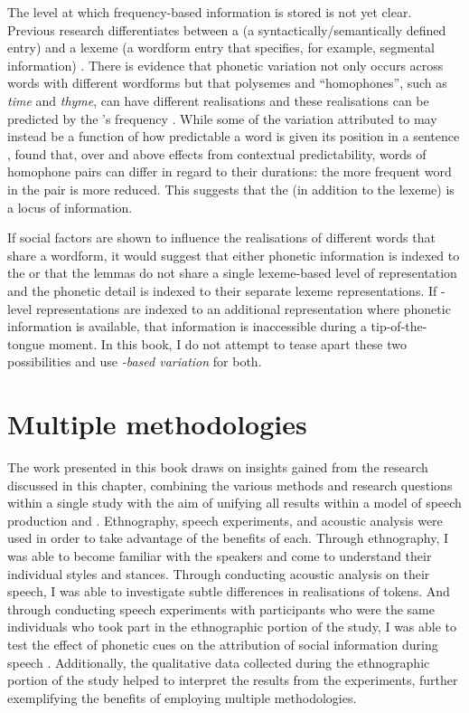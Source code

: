 The level at which frequency-based information is stored is not yet clear. Previous research differentiates between a  (a syntactically/semantically defined entry) and a lexeme (a wordform entry that specifies, for example, segmental information) \citep{bock1995}. There is evidence that phonetic variation not only occurs across words with different wordforms but that polysemes and ``homophones'', such as \textit{time} and \textit{thyme}, can have different realisations and these realisations can be predicted by the 's frequency \citep{gahl-thyme,jurafskyetal2002}. While some of the variation attributed to  may instead be a function of how predictable a word is given its position in a sentence \citep{jurafskyetal2002}, \citet{gahl-thyme} found that, over and above effects from contextual predictability, words of homophone pairs can differ in regard to their durations: the more frequent word in the pair is more reduced. This suggests that the  (in addition to the lexeme) is a locus of  information. 

If social factors are shown to influence the realisations of different words that share a wordform, it would suggest that either phonetic information is indexed to the  or that the lemmas do not share a single lexeme-based level of representation and the phonetic detail is indexed to their separate lexeme representations. If -level representations are indexed to an additional representation where phonetic information is available, that information is inaccessible during a tip-of-the-tongue moment. \nocite{johnson1997}\nocite{pierrehumbert2001}\nocite{pierrehumbert2006} In this book, I do not attempt to tease apart these two possibilities and use \textit{-based variation} for both.

							

 \section{Multiple methodologies}
The work presented in this book draws on insights gained from the research discussed in this chapter, combining the various methods and research questions within a single study with the aim of unifying all results within a model of speech production and . Ethnography, speech  experiments, and acoustic analysis were used in order to take advantage of the benefits of each. Through ethnography, I was able to become familiar with the speakers and come to understand their individual styles and stances. Through conducting acoustic analysis on their speech, I was able to investigate subtle differences in realisations of tokens. And through conducting speech  experiments with participants who were the same individuals who took part in the ethnographic portion of the study, I was able to test the effect of phonetic cues on the attribution of social information during speech . Additionally, the qualitative data collected during the ethnographic portion of the study helped to interpret the results from the  experiments, further exemplifying the benefits of employing multiple methodologies.

